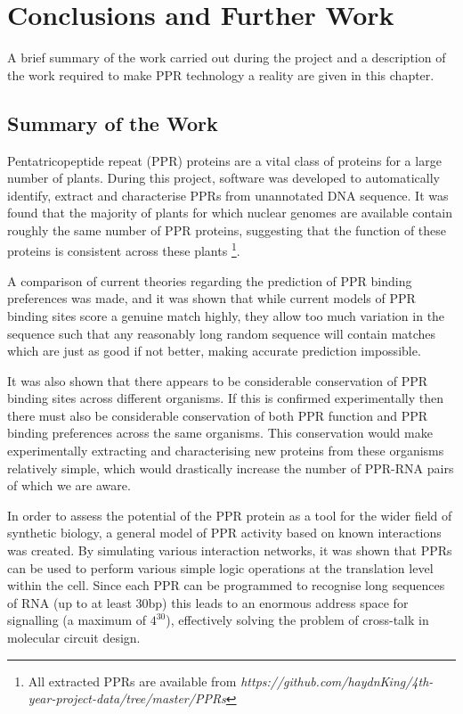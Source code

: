 
\chapter{Conclusions and Further Work}
\label{chap:Conclusions} 

\lettrine{A}{} brief summary of the work carried out during the project and a 
description of the work required to make PPR technology a reality are given in 
this chapter.

\section{Summary of the Work}

Pentatricopeptide repeat (PPR) proteins are a vital class of proteins for a 
large number of plants.
During this project, software was developed to automatically identify, extract 
and characterise PPRs from unannotated DNA sequence.
It was found that the majority of plants for which nuclear genomes are 
available contain roughly the same number of PPR proteins, suggesting that the
function of these proteins is consistent across these plants
\footnote{All extracted PPRs are available from
\emph{https://github.com/haydnKing/4th-year-project-data/tree/master/PPRs}}.

A comparison of current theories regarding the prediction of PPR binding
preferences was made, and it was shown that while current models of PPR binding
sites score a genuine match highly, they allow too much variation in the
sequence such that any reasonably long random sequence will contain matches 
which are just as good if not better, making accurate prediction impossible.

It was also shown that there appears to be considerable conservation of PPR 
binding sites across different organisms.
If this is confirmed experimentally then there must also be considerable 
conservation of both PPR function and PPR binding preferences across the same 
organisms.
This conservation would make experimentally extracting and characterising new
proteins from these organisms relatively simple, which would drastically 
increase the number of PPR-RNA pairs of which we are aware.

In order to assess the potential of the PPR protein as a tool for the wider
field of synthetic biology, a general model of PPR activity based on known 
interactions was created.
By simulating various interaction networks, it was shown that PPRs can be 
used to perform various simple logic operations at the translation level within
the cell.
Since each PPR can be programmed to recognise long sequences of RNA (up to at
least $30$bp) this leads to an enormous address space for signalling (a maximum
of $4^{30}$), effectively solving the problem of cross-talk in molecular 
circuit design.

